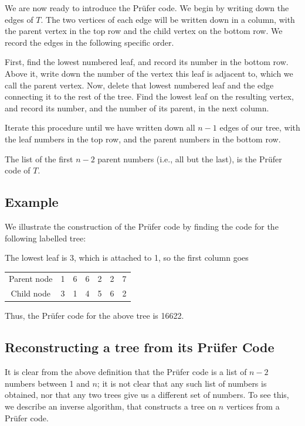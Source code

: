 \documentclass[]{article}
\begin{document}
We are now ready to introduce the Prüfer code. We begin by writing down
the edges of \(T\). The two vertices of each edge will be written down
in a column, with the parent vertex in the top row and the child vertex
on the bottom row. We record the edges in the following specific order.

First, find the lowest numbered leaf, and record its number in the
bottom row. Above it, write down the number of the vertex this leaf is
adjacent to, which we call the parent vertex. Now, delete that lowest
numbered leaf and the edge connecting it to the rest of the tree. Find
the lowest leaf on the resulting vertex, and record its number, and the
number of its parent, in the next column.

Iterate this procedure until we have written down all \(n-1\) edges of
our tree, with the leaf numbers in the top row, and the parent numbers
in the bottom row.

The list of the first \(n-2\) parent numbers (i.e., all but the last),
is the Prüfer code of \(T\).

\subsection{Example}\label{example-2}

We illustrate the construction of the Prüfer code by finding the code
for the following labelled tree:

The lowest leaf is 3, which is attached to 1, so the first column goes

\begin{tabular}{c c c c c c c}
  Parent node & 1 & 6 & 6 & 2 & 2 & 7 \\
  Child node & 3 & 1 & 4 & 5 & 6 & 2
\end{tabular}

Thus, the Prüfer code for the above tree is 16622.

\subsection{Reconstructing a tree from its Prüfer
Code}\label{reconstructing-a-tree-from-its-pruxfcfer-code}

It is clear from the above definition that the Prüfer code is a list of
\(n-2\) numbers between 1 and \(n\); it is not clear that any such list
of numbers is obtained, nor that any two trees give us a different set
of numbers. To see this, we describe an inverse algorithm, that
constructs a tree on \(n\) vertices from a Prüfer code.
\end{document}

